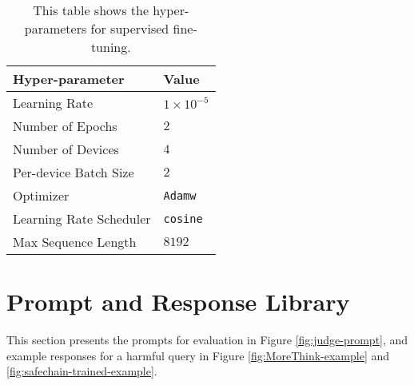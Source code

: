 \begin{table}[htbp]
\small
\centering
\begin{tabular}{ll}
\toprule
\textbf{Hyper-parameter} & \textbf{Value} \\ \midrule
Learning Rate & $1 \times 10^{-5}$ \\
Number of Epochs & $2$ \\
Number of Devices & $4$ \\
Per-device Batch Size & $2$ \\
Optimizer & \texttt{Adamw} \\
Learning Rate Scheduler & \texttt{cosine} \\
Max Sequence Length  & $8192$ \\ \bottomrule
\end{tabular}
\caption{This table shows the hyper-parameters for supervised fine-tuning.}
\label{tab: training-hyperparameters}
\end{table}







\section{Prompt and Response Library}\label{app:example}
This section presents the prompts for evaluation in Figure \ref{fig:judge-prompt}, and example responses for a harmful query in Figure \ref{fig:MoreThink-example} and \ref{fig:safechain-trained-example}.

\clearpage



